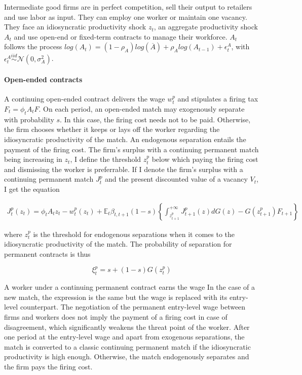 \documentclass[a4paper]{article}
\begin{document}
Intermediate good firms are in perfect competition, sell their output to retailers and use labor as input. They can employ one worker or maintain one vacancy. They face an idiosyncratic productivity shock $z_t$, an aggregate productivity shock $A_t$ and use open-end or fixed-term contracts to manage their workforce. $A_t$ follows the process $log\left(A_t\right) = (1-\rho_A) log\left(\overline{A}\right) + \rho_A log\left(A_{t-1}\right) + \epsilon_t^A$, with $\epsilon_t^A \overset{iid}{\sim} \mathcal{N} \left( 0, \sigma_A^2 \right)$.

\paragraph{Open-ended contracts} A continuing open-ended contract delivers the wage $w_{t}^{p}$ and stipulates a firing tax $F_t = \phi_t A_t F$. On each period, an open-ended match may exogenously separate with probability $s$. In this case, the firing cost needs not to be paid. Otherwise, the firm chooses whether it keeps or lays off the worker regarding the idiosyncratic productivity of the match. An endogenous separation entails the payment of the firing cost. The firm's surplus with a continuing permanent match being increasing in $z_t$, I define the threshold $z_t^p$ below which paying the firing cost and dismissing the worker is preferrable. If I denote the firm's surplus with a continuing permanent match $J_t^p$ and the present discounted value of a vacancy $V_t$, I get the equation

\begin{align*}
J_t^p \left( z_{t} \right) = \phi_t A_t z_{t} - w_{t}^{p} \left( z_t \right) + \mathbb{E}_{t} \beta_{t,t+1} (1-s) \left\{ \int_{z_{t+1}^p}^{+\infty} J_{t+1}^{p} \left( z \right) dG(z) - G\left(z_{t+1}^p\right) F_{t+1} \right\}
\end{align*}

where $z_t^p$ is the threshold for endogenous separations when it comes to the idiosyncratic productivity of the match. The probability of separation for permanent contracts is thus

\begin{equation}
\xi_t^p = s + (1-s) G\left( z_t^p \right) \label{def_xip}
\end{equation}

A worker under a continuing permanent contract earns the wage 
In the case of a new match, the expression is the same but the wage is replaced with its entry-level counterpart. The negotiation of the permanent entry-level wage between firms and workers does not imply the payment of a firing cost in case of disagreement, which significantly weakens the threat point of the worker. After one period at the entry-level wage and apart from exogenous separations, the match is converted to a classic continuing permanent match if the idiosyncratic productivity is high enough. Otherwise, the match endogenously separates and the firm pays the firing cost.
\end{document}
